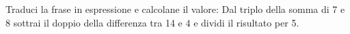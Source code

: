 \item Traduci la frase in espressione e calcolane il valore: Dal triplo della somma di 7 e 8 sottrai il doppio della differenza tra 14 e 4 e dividi il risultato per 5.